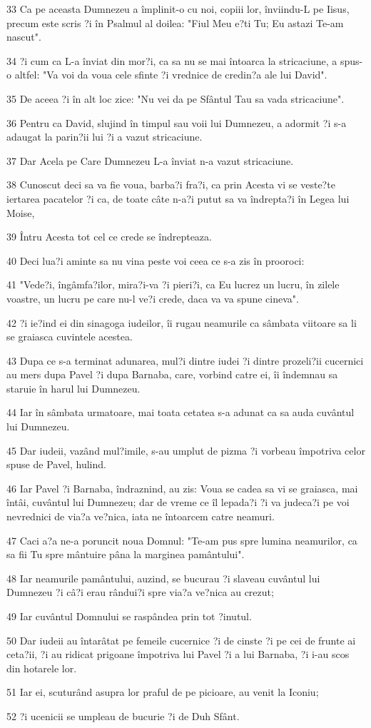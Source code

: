 \par 33 Ca pe aceasta Dumnezeu a împlinit-o cu noi, copiii lor, înviindu-L pe Iisus, precum este scris ?i în Psalmul al doilea: "Fiul Meu e?ti Tu; Eu astazi Te-am nascut".
\par 34 ?i cum ca L-a înviat din mor?i, ca sa nu se mai întoarca la stricaciune, a spus-o altfel: "Va voi da voua cele sfinte ?i vrednice de credin?a ale lui David".
\par 35 De aceea ?i în alt loc zice: "Nu vei da pe Sfântul Tau sa vada stricaciune".
\par 36 Pentru ca David, slujind în timpul sau voii lui Dumnezeu, a adormit ?i s-a adaugat la parin?ii lui ?i a vazut stricaciune.
\par 37 Dar Acela pe Care Dumnezeu L-a înviat n-a vazut stricaciune.
\par 38 Cunoscut deci sa va fie voua, barba?i fra?i, ca prin Acesta vi se veste?te iertarea pacatelor ?i ca, de toate câte n-a?i putut sa va îndrepta?i în Legea lui Moise,
\par 39 Întru Acesta tot cel ce crede se îndrepteaza.
\par 40 Deci lua?i aminte sa nu vina peste voi ceea ce s-a zis în prooroci:
\par 41 "Vede?i, îngâmfa?ilor, mira?i-va ?i pieri?i, ca Eu lucrez un lucru, în zilele voastre, un lucru pe care nu-l ve?i crede, daca va va spune cineva".
\par 42 ?i ie?ind ei din sinagoga iudeilor, îi rugau neamurile ca sâmbata viitoare sa li se graiasca cuvintele acestea.
\par 43 Dupa ce s-a terminat adunarea, mul?i dintre iudei ?i dintre prozeli?ii cucernici au mers dupa Pavel ?i dupa Barnaba, care, vorbind catre ei, îi îndemnau sa staruie în harul lui Dumnezeu.
\par 44 Iar în sâmbata urmatoare, mai toata cetatea s-a adunat ca sa auda cuvântul lui Dumnezeu.
\par 45 Dar iudeii, vazând mul?imile, s-au umplut de pizma ?i vorbeau împotriva celor spuse de Pavel, hulind.
\par 46 Iar Pavel ?i Barnaba, îndraznind, au zis: Voua se cadea sa vi se graiasca, mai întâi, cuvântul lui Dumnezeu; dar de vreme ce îl lepada?i ?i va judeca?i pe voi nevrednici de via?a ve?nica, iata ne întoarcem catre neamuri.
\par 47 Caci a?a ne-a poruncit noua Domnul: "Te-am pus spre lumina neamurilor, ca sa fii Tu spre mântuire pâna la marginea pamântului".
\par 48 Iar neamurile pamântului, auzind, se bucurau ?i slaveau cuvântul lui Dumnezeu ?i câ?i erau rândui?i spre via?a ve?nica au crezut;
\par 49 Iar cuvântul Domnului se raspândea prin tot ?inutul.
\par 50 Dar iudeii au întarâtat pe femeile cucernice ?i de cinste ?i pe cei de frunte ai ceta?ii, ?i au ridicat prigoane împotriva lui Pavel ?i a lui Barnaba, ?i i-au scos din hotarele lor.
\par 51 Iar ei, scuturând asupra lor praful de pe picioare, au venit la Iconiu;
\par 52 ?i ucenicii se umpleau de bucurie ?i de Duh Sfânt.

